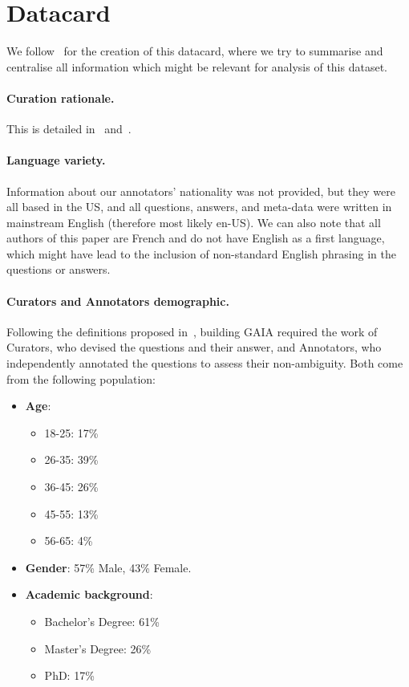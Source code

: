 \documentclass{fairmeta}
\newcommand{\benchmark}{\textsc{GAIA}}
\begin{document}
\section{Datacard}
We follow~\citep{bender-friedman-2018-data} for the creation of this datacard, where we try to summarise and centralise all information which might be relevant for analysis of this dataset.

\paragraph{Curation rationale.} This is detailed in~ and~.

\paragraph{Language variety.}
Information about our annotators' nationality was not provided, but they were all based in the US, and all questions, answers, and meta-data were written in mainstream English (therefore most likely en-US). We can also note that all authors of this paper are French and do not have English as a first language, which might have lead to the inclusion of non-standard English phrasing in the questions or answers.

\paragraph{Curators and Annotators demographic.}
Following the definitions proposed in~\citep{bender-friedman-2018-data}, building \benchmark{} required the work of Curators, who devised the questions and their answer, and Annotators, who independently annotated the questions to assess their non-ambiguity. Both come from the following population: 
\begin{itemize}
    \item \textbf{Age}: 
    \begin{itemize}
            \item 18-25: 17\%
            \item 26-35: 39\%
            \item 36-45: 26\%
            \item 45-55: 13\%
            \item 56-65: 4\%
    \end{itemize}
    \item \textbf{Gender}: 57\% Male, 43\% Female.
   \item \textbf{Academic background}:
   \begin{itemize}
       \item Bachelor's Degree: 61\%
       \item Master's Degree: 26\%
       \item PhD: 17\%
   \end{itemize}
\end{itemize}
\end{document}
